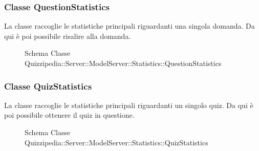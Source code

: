 \subsubsection{Classe QuestionStatistics}
La classe raccoglie le statistiche principali riguardanti una singola domanda. Da qui è poi possibile risalire alla domanda.
\begin{figure}[H]
\centering
\noindent{}
\caption[Schema Classe QuestionStatistics]{Schema Classe Quizzipedia::Server::ModelServer::Statistics::QuestionStatistics}
\end{figure}
\subsubsection{Classe QuizStatistics}
La classe raccoglie le statistiche principali riguardanti un singolo quiz. Da qui è poi possibile ottenere il quiz in questione.
\begin{figure}[H]
\centering
\noindent{}
\caption[Schema Classe QuizStatistics]{Schema Classe Quizzipedia::Server::ModelServer::Statistics::QuizStatistics}
\end{figure}
